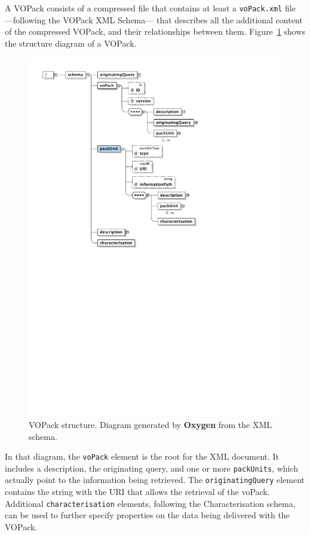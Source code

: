 			A VOPack consists of a compressed file that contains at
			least a \texttt{voPack.xml} file —following the VOPack
			XML Schema— that describes all the additional content
			of the compressed VOPack, and their relationships
			between them. Figure~\ref{figVOPackStructure} shows the
			structure diagram of a VOPack.
			
			\begin{figure}[tbp]
			\begin{center}
				\includegraphics[scale=0.5]
				{fig/vopack-structure.pdf}
			\end{center}
			\caption[VOPack structure]
			{
				VOPack structure. Diagram generated by
				\textbf{Oxygen} from the XML schema.
			}
			\label{figVOPackStructure}
			\end{figure}
			
			In that diagram, the \texttt{voPack} element is the
			root for the XML document. It includes a description,
			the originating query, and one or more
			\texttt{packUnits}, which actually point to the
			information being retrieved. The
			\texttt{o\-rig\-i\-na\-ting\-Que\-ry}
			element contains the string
			with the URI that allows the retrieval of the voPack.
			Additional \texttt{characterisation} elements,
			following the Characterisation schema, can be used to
			further specify properties on the data being delivered
			with the VOPack.
			
